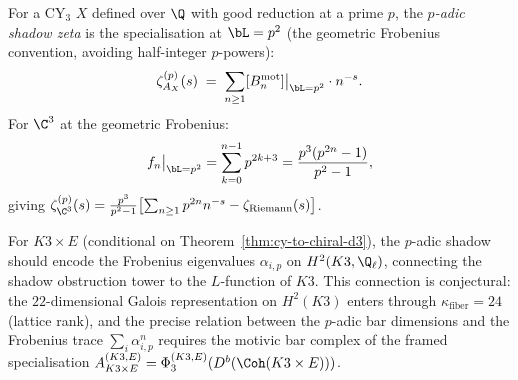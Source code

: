\begin{remark}
\label{rem:padic-shadow}
For a CY$_3$ $X$ defined over $\Q$ with good reduction at a prime $p$, the \emph{$p$-adic shadow zeta} is the specialisation at $\bL = p^2$ (the geometric Frobenius convention, avoiding half-integer $p$-powers):
\begin{equation}
\label{eq:padic-shadow-zeta}
 \zeta_{A_X}^{(p)}(s) \;=\; \sum_{n \geq 1} [B_n^{\mathrm{mot}}]\big|_{\bL = p^2} \cdot n^{-s}.
\end{equation}
For $\C^3$ at the geometric Frobenius:
\[
 f_n\big|_{\bL = p^2} = \sum_{k=0}^{n-1} p^{2k+3} = \frac{p^3(p^{2n} - 1)}{p^2 - 1},
\]
giving $\zeta_{\C^3}^{(p)}(s) = \frac{p^3}{p^2 - 1} \bigl[\sum_{n \geq 1} p^{2n} n^{-s} - \zeta_{\mathrm{Riemann}}(s)\bigr]$.

For $K3 \times E$ (conditional on Theorem~\ref{thm:cy-to-chiral-d3}), the $p$-adic shadow should encode the Frobenius eigenvalues $\alpha_{i,p}$ on $H^2(K3, \Q_\ell)$, connecting the shadow obstruction tower to the $L$-function of $K3$. This connection is conjectural: the $22$-dimensional Galois representation on $H^2(K3)$ enters through $\kappa_{\mathrm{fiber}} = 24$ (lattice rank), and the precise relation between the $p$-adic bar dimensions and the Frobenius trace $\sum_i \alpha_{i,p}^n$ requires the motivic bar complex of the framed specialisation $A_{K3 \times E}^{(K3,E)}=\Phi_3^{(K3,E)}(D^b(\Coh(K3 \times E)))$.
\end{remark}

